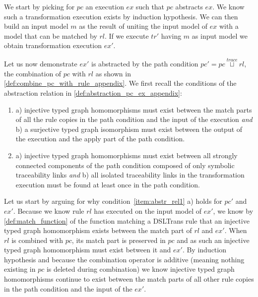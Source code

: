 \begin{ps}
\begin{itemize}
We start by picking for $pc$ an execution $ex$ such that $pc$ abstracts $ex$. We know such a transformation execution exists by induction hypothesis. We can then build an input model $m$ as the result of uniting the input model of $ex$ with a model that can be matched by $rl$. If we execute $tr'$ having $m$ as input model we obtain transformation execution $ex'$.

Let us now demonstrate $ex'$ is abstracted by the path condition $pc'=pc\stackrel{trace}{\sqcup} rl$, the combination of $pc$ with $rl$ as shown in \cref{def:combine_pc_with_rule_appendix}. We first recall the conditions of the abstraction relation in \cref{def:abstraction_pc_ex_appendix}:
\begin{enumerate}
	\item\label{item:abstr_rel1} a) injective typed graph homomorphisms must exist between the match parts of all the rule copies in the path condition and the input of the execution \emph{and} b) a surjective typed graph isomorphism must exist between the output of the execution and the apply part of the path condition.
    \item\label{item:abstr_rel2} a) injective typed graph homomorphisms must exist between all strongly connected components of the path condition composed of only symbolic traceability links \emph{and} b) all isolated traceability links in the transformation execution must be found at least once in the path condition.\vspace{.3cm}
\end{enumerate} 

Let us start by arguing for why condition~\ref{item:abstr_rel1} a) holds for $pc'$ and $ex'$. Because we know rule $rl$ has executed on the input model of $ex'$, we know by \cref{def:match_function} of the function matching a DSLTrans rule that an injective typed graph homomorphism exists between the match part of $rl$ and $ex'$. When $rl$ is combined with $pc$, its match part is preserved in $pc$ and as such an injective typed graph homomorphism must exist between it and $ex'$. By induction hypothesis and because the combination operator is additive (meaning nothing existing in $pc$ is deleted during combination) we know injective typed graph homomorphisms continue to exist between the match parts of all other rule copies in the path condition and the input of the $ex'$.\vspace{.3cm}


\end{itemize}
\end{ps}
